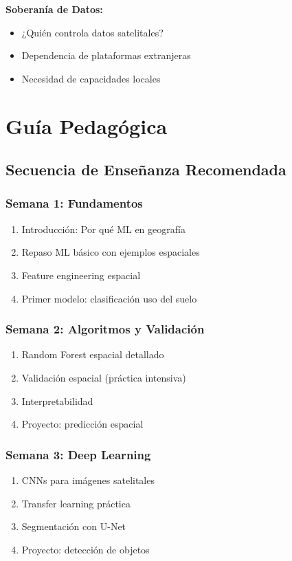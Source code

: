 \documentclass[12pt,a4paper]{article}
\begin{document}
\textbf{Soberanía de Datos:}
\begin{itemize}
    \item ¿Quién controla datos satelitales?
    \item Dependencia de plataformas extranjeras
    \item Necesidad de capacidades locales
\end{itemize}

\section{Guía Pedagógica}

\subsection{Secuencia de Enseñanza Recomendada}

\subsubsection{Semana 1: Fundamentos}
\begin{enumerate}
    \item Introducción: Por qué ML en geografía
    \item Repaso ML básico con ejemplos espaciales
    \item Feature engineering espacial
    \item Primer modelo: clasificación uso del suelo
\end{enumerate}

\subsubsection{Semana 2: Algoritmos y Validación}
\begin{enumerate}
    \item Random Forest espacial detallado
    \item Validación espacial (práctica intensiva)
    \item Interpretabilidad
    \item Proyecto: predicción espacial
\end{enumerate}

\subsubsection{Semana 3: Deep Learning}
\begin{enumerate}
    \item CNNs para imágenes satelitales
    \item Transfer learning práctica
    \item Segmentación con U-Net
    \item Proyecto: detección de objetos
\end{enumerate}
\end{document}
